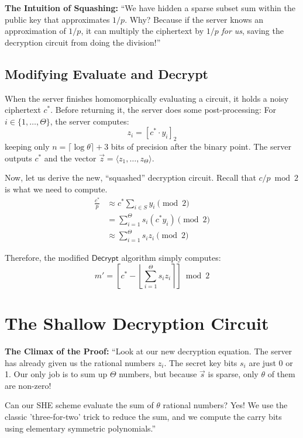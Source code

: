 \documentclass[11pt]{article}
\begin{document}
\begin{speakernote}
\textbf{The Intuition of Squashing:}
``We have hidden a sparse subset sum within the public key that approximates $1/p$. Why? Because if the server knows an approximation of $1/p$, it can multiply the ciphertext by $1/p$ \textit{for us}, saving the decryption circuit from doing the division!''
\end{speakernote}

\subsection{Modifying Evaluate and Decrypt}
When the server finishes homomorphically evaluating a circuit, it holds a noisy ciphertext $c^*$. Before returning it, the server does some post-processing:
For $i \in \{1, \dots, \Theta\}$, the server computes:
\begin{equation}
    z_i = [c^* \cdot y_i]_2
\end{equation}
keeping only $n = \lceil \log \theta \rceil + 3$ bits of precision after the binary point. The server outputs $c^*$ and the vector $\vec{z} = \langle z_1, \dots, z_\Theta \rangle$.

Now, let us derive the new, ``squashed'' decryption circuit. Recall that $c/p \bmod 2$ is what we need to compute.
\begin{align}
    \frac{c^*}{p} &\approx c^* \sum_{i \in S} y_i \pmod 2 \\
    &= \sum_{i=1}^\Theta s_i (c^* y_i) \pmod 2 \\
    &\approx \sum_{i=1}^\Theta s_i z_i \pmod 2
\end{align}

Therefore, the modified $\mathsf{Decrypt}$ algorithm simply computes:
\begin{equation}
    m' = \left[ c^* - \left\lfloor \sum_{i=1}^\Theta s_i z_i \right\rceil \right] \bmod 2
\end{equation}

\section{The Shallow Decryption Circuit}

\begin{speakernote}
\textbf{The Climax of the Proof:}
``Look at our new decryption equation. The server has already given us the rational numbers $z_i$. The secret key bits $s_i$ are just 0 or 1. Our only job is to sum up $\Theta$ numbers, but because $\vec{s}$ is sparse, only $\theta$ of them are non-zero! 

Can our SHE scheme evaluate the sum of $\theta$ rational numbers? Yes! We use the classic 'three-for-two' trick to reduce the sum, and we compute the carry bits using elementary symmetric polynomials.''
\end{speakernote}
\end{document}
